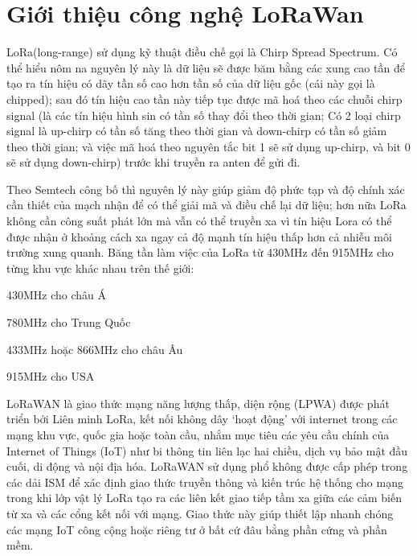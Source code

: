 \section{Giới thiệu công nghệ LoRaWan}
LoRa(long-range) sử dụng kỹ thuật điều chế gọi là Chirp Spread Spectrum.
Có thể hiểu nôm na nguyên lý này là dữ liệu sẽ được băm bằng các xung cao tần để tạo ra tín hiệu có dãy tần số cao hơn tần số của dữ liệu gốc (cái này gọi là chipped); sau đó tín hiệu cao tần này tiếp tục được mã hoá theo các chuỗi chirp signal (là các tín hiệu hình sin có tần số thay đổi theo thời gian; 
Có 2 loại chirp signal là up-chirp có tần số tăng theo thời gian và down-chirp có tần số giảm theo thời gian; và việc mã hoá theo nguyên tắc bit 1 sẽ sử dụng up-chirp, và bit 0 sẽ sử dụng down-chirp) trước khi truyền ra anten để gửi đi.

Theo Semtech công bố thì nguyên lý này giúp giảm độ phức tạp và độ chính xác cần thiết của mạch nhận để có thể giải mã và điều chế lại dữ liệu; hơn nữa LoRa không cần công suất phát lớn mà vẫn có thể truyền xa vì tín hiệu Lora có thể được nhận ở khoảng cách xa ngay cả độ mạnh tín hiệu thấp hơn cả nhiễu môi trường xung quanh.
Băng tần làm việc của LoRa từ 430MHz đến 915MHz cho từng khu vực khác nhau trên thế giới:

430MHz cho châu Á

780MHz cho Trung Quốc

433MHz hoặc 866MHz cho châu Âu

915MHz cho USA

LoRaWAN là giao thức mạng năng lượng thấp, diện rộng (LPWA) được phát triển bởi Liên minh LoRa, kết nối không dây ‘hoạt động’ với internet trong các mạng khu vực, quốc gia hoặc toàn cầu, nhắm mục tiêu các yêu cầu chính của Internet of Things (IoT) như bi thông tin liên lạc hai chiều, dịch vụ bảo mật đầu cuối, di động và nội địa hóa.
LoRaWAN sử dụng phổ không được cấp phép trong các dải ISM để xác định giao thức truyền thông và kiến ​​trúc hệ thống cho mạng trong khi lớp vật lý LoRa tạo ra các liên kết giao tiếp tầm xa giữa các cảm biến từ xa và các cổng kết nối với mạng. Giao thức này giúp thiết lập nhanh chóng các mạng IoT công cộng hoặc riêng tư ở bất cứ đâu bằng phần cứng và phần mềm.

